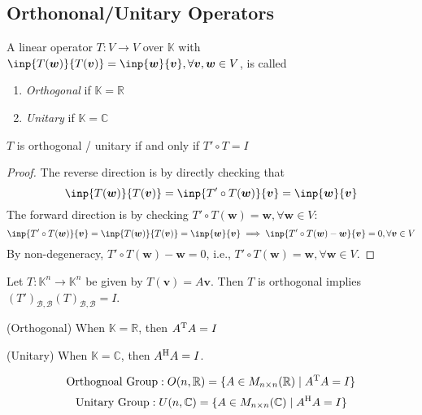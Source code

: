 \subsection{Orthononal/Unitary Operators}
\begin{definition}
A linear operator $T:V\to V$ over $\mathbb{K}$ with $\inp{T(\bm w)}{T(\bm v)}=\inp{\bm w}{\bm v},\forall \bm v,\bm w\in V$, is called
\begin{enumerate}
\item
\emph{Orthogonal} if $\mathbb{K}=\mathbb{R}$
\item
\emph{Unitary} if $\mathbb{K}=\mathbb{C}$
\end{enumerate}
\end{definition}
\begin{proposition}
$T$ is orthogonal / unitary if and only if $T'\circ T=I$
\end{proposition}
\begin{proof}
The reverse direction is by directly checking that 
\[
\inp{T(\bm w)}{T(\bm v)}=\inp{T'\circ T(\bm w)}{\bm v}=\inp{\bm w}{\bm v}
\]
The forward direction is by checking $T'\circ T(\bm w)=\bm w,\forall \bm w\in V$:
\[
\inp{T'\circ T(\bm w)}{\bm v}=\inp{T(\bm w)}{T(\bm v)}=\inp{\bm w}{\bm v}
\implies
\inp{T'\circ T(\bm w)-\bm w}{\bm v}=0,\forall \bm v\in V
\]
By non-degeneracy, $T'\circ T(\bm w)-\bm w=0$, i.e.,
$T'\circ T(\bm w)=\bm w,\forall \bm w\in V$.
\end{proof}

\begin{example}
Let $T:\mathbb{K}^n\to\mathbb{K}^n$ be given by $T(\bm v)=A\bm v$.
Then $T$ is orthogonal implies $(T')_{\mathcal{B},\mathcal{B}}(T)_{\mathcal{B},\mathcal{B}}=I$.

(Orthogonal) When $\mathbb{K}=\mathbb{R}$, then $A^{\mathrm T} A=I$

(Unitary) When $\mathbb{K}=\mathbb{C}$, then $A^{\mathrm H} A=I$.
\end{example}

\begin{definition}
\[\text{Orthognoal Group}:
O(n,\mathbb{R})=\{A\in M_{n\times n}(\mathbb{R})\mid A^{\mathrm T} A=I\}
\]
\[\text{Unitary Group}:
U(n,\mathbb{C})=\{A\in M_{n\times n}(\mathbb{C})\mid A^{\mathrm H} A=I\}
\]
\end{definition}















